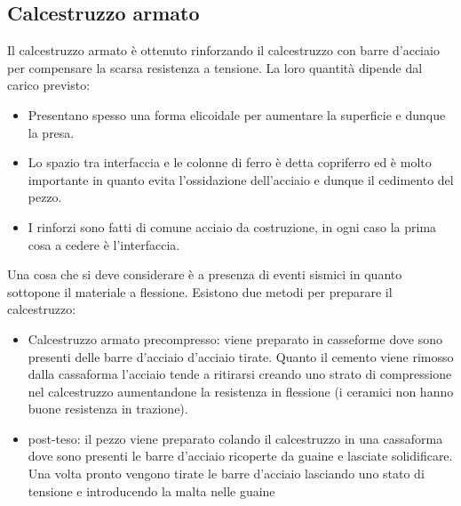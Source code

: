 \documentclass{article}
\begin{document}
\subsection{Calcestruzzo armato}

Il calcestruzzo armato è ottenuto rinforzando il calcestruzzo con barre d'acciaio per compensare la scarsa resistenza a tensione. La loro quantità dipende dal carico previsto:
\begin{itemize}
    \item Presentano spesso una forma elicoidale per aumentare la superficie e dunque la presa.
    \item Lo spazio tra interfaccia e le colonne di ferro è detta copriferro ed è molto importante in quanto evita l'ossidazione dell'acciaio e dunque il cedimento del pezzo.
    \item I rinforzi sono fatti di comune acciaio da costruzione, in ogni caso la prima cosa a cedere è l'interfaccia. 
\end{itemize}
Una cosa che si deve considerare è a presenza di eventi sismici in quanto sottopone il materiale a flessione.
Esistono due metodi per preparare il calcestruzzo:
\begin{itemize}
    \item Calcestruzzo armato precompresso: viene preparato in casseforme dove sono presenti delle barre d'acciaio d'acciaio tirate. Quanto il cemento viene rimosso dalla cassaforma l'acciaio tende a ritirarsi creando uno strato di compressione nel calcestruzzo aumentandone la resistenza in flessione (i ceramici non hanno buone resistenza in trazione).
    \item post-teso: il pezzo viene preparato colando il calcestruzzo in una cassaforma dove sono presenti le barre d'acciaio ricoperte da guaine e lasciate solidificare. Una volta pronto vengono tirate le barre d'acciaio lasciando uno stato di tensione e introducendo la malta nelle guaine 
\end{itemize}




\end{document}
